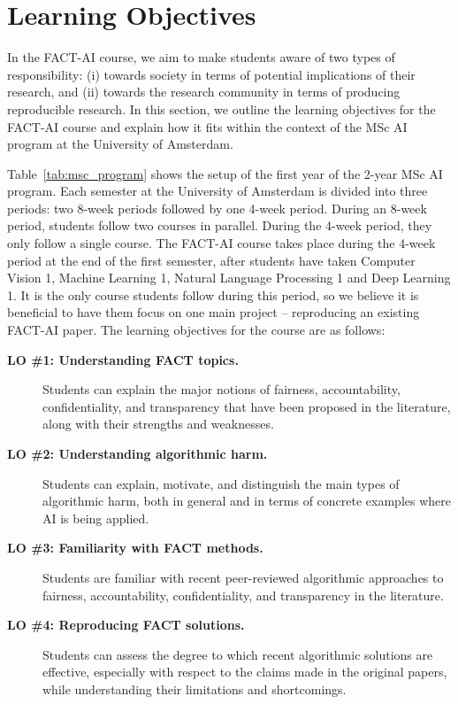 \documentclass[letterpaper]{article}
\newcommand{\OurUniversity}{the University of Amsterdam}
\begin{document}
\section{Learning Objectives}
\label{section:learning-objectives}

In the FACT-AI course, we aim to make students aware of two types of responsibility: (i) towards society in terms of potential implications of their research, and (ii) towards the research community in terms of producing reproducible research.
In this section, we outline the learning objectives for the FACT-AI course and explain how it fits within the context of the MSc AI program at \OurUniversity{}.

Table~\ref{tab:msc_program} shows the setup of the first year of the 2-year MSc AI program. Each semester at \OurUniversity{} is divided into three periods: two 8-week periods followed by one 4-week period. During an 8-week period, students follow two courses in parallel. During the 4-week period, they only follow a single course.
The FACT-AI course takes place during the 4-week period at the end of the first semester, after students have taken Computer Vision 1, Machine Learning 1, Natural Language Processing 1 and Deep Learning 1.
It is the only course students follow during this period, so we believe it is beneficial to have them focus on one main project -- reproducing an existing FACT-AI paper.
The learning objectives for the course are as follows:
\begin{description}
	\item[\textbf{LO \#1: Understanding FACT topics.}] Students can explain the major notions of fairness, accountability, confidentiality, and transparency that have been proposed in the literature, along with their strengths and weaknesses.
	\item[\textbf{LO \#2: Understanding algorithmic harm.}] Students can explain, motivate, and distinguish the main types of algorithmic harm, both in general and in terms of concrete examples where AI is being applied.
	\item[\textbf{LO \#3: Familiarity with FACT methods.}] Students are familiar with recent peer-reviewed algorithmic approaches to fairness, accountability, confidentiality, and transparency in the literature.
    \item[\textbf{LO \#4: Reproducing FACT solutions.}] Students can assess the degree to which recent algorithmic solutions are effective, especially with respect to the claims made in the original papers, while understanding their limitations and shortcomings.
\end{description}
\fi
\end{document}
